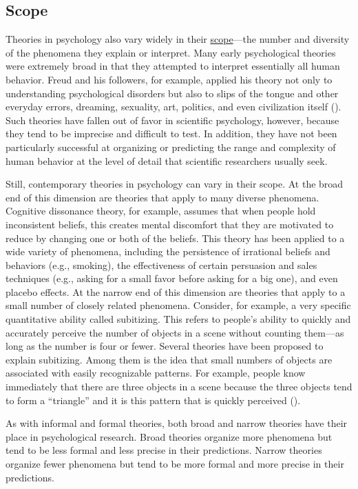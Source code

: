 \documentclass[
]{krantz}
\begin{document}
\subsection*{Scope}\label{scope}


Theories in psychology also vary widely in their \hyperref[scope]{scope}---the number and diversity of the phenomena they explain or interpret. Many early psychological theories were extremely broad in that they attempted to interpret essentially all human behavior. Freud and his followers, for example, applied his theory not only to understanding psychological disorders but also to slips of the tongue and other everyday errors, dreaming, sexuality, art, politics, and even civilization itself (). Such theories have fallen out of favor in scientific psychology, however, because they tend to be imprecise and difficult to test. In addition, they have not been particularly successful at organizing or predicting the range and complexity of human behavior at the level of detail that scientific researchers usually seek.

Still, contemporary theories in psychology can vary in their scope. At the broad end of this dimension are theories that apply to many diverse phenomena. Cognitive dissonance theory, for example, assumes that when people hold inconsistent beliefs, this creates mental discomfort that they are motivated to reduce by changing one or both of the beliefs. This theory has been applied to a wide variety of phenomena, including the persistence of irrational beliefs and behaviors (e.g., smoking), the effectiveness of certain persuasion and sales techniques (e.g., asking for a small favor before asking for a big one), and even placebo effects. At the narrow end of this dimension are theories that apply to a small number of closely related phenomena. Consider, for example, a very specific quantitative ability called subitizing. This refers to people's ability to quickly and accurately perceive the number of objects in a scene without counting them---as long as the number is four or fewer. Several theories have been proposed to explain subitizing. Among them is the idea that small numbers of objects are associated with easily recognizable patterns. For example, people know immediately that there are three objects in a scene because the three objects tend to form a ``triangle'' and it is this pattern that is quickly perceived ().

As with informal and formal theories, both broad and narrow theories have their place in psychological research. Broad theories organize more phenomena but tend to be less formal and less precise in their predictions. Narrow theories organize fewer phenomena but tend to be more formal and more precise in their predictions.
\end{document}
